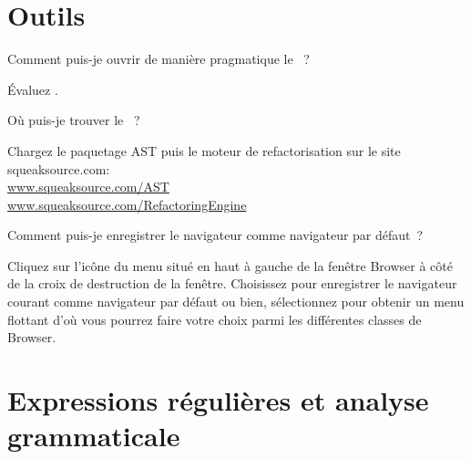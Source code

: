 \documentclass[a4paper,10pt,twoside]{book}
\begin{document}
\section{Outils}

\begin{faq}
Comment puis-je ouvrir de mani\`ere pragmatique le  ~?
\end{faq}
\answer
\'Evaluez .

\begin{faq}
O\`u puis-je trouver le ~?
\end{faq}
\answer
Chargez le paquetage AST puis le moteur de 
refactorisation sur le site squeaksource.com:\\
\url{www.squeaksource.com/AST}\\
\url{www.squeaksource.com/RefactoringEngine}

\begin{faq}
Comment puis-je enregistrer le navigateur comme navigateur par d\'efaut~?
\end{faq}
\answer
Cliquez sur l'ic\^one du menu situ\'e en haut à gauche de la fen\^etre Browser \`a c\^ot\'e de la croix de destruction de la fen\^etre. 
Choisissez  pour enregistrer le navigateur courant comme navigateur par d\'efaut ou bien, s\'electionnez  pour obtenir un menu flottant d'o\`u vous pourrez faire votre choix parmi les diff\'erentes classes de Browser.

\section{Expressions r\'eguli\`eres et analyse grammaticale}
\end{document}
